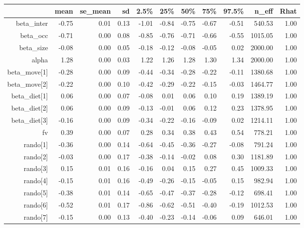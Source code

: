 \begin{table}[ht]
\centering
\begin{tabular}{rrrrrrrrrrr}
  \hline
 & mean & se\_mean & sd & 2.5\% & 25\% & 50\% & 75\% & 97.5\% & n\_eff & Rhat \\ 
  \hline
beta\_inter & -0.75 & 0.01 & 0.13 & -1.01 & -0.84 & -0.75 & -0.67 & -0.51 & 540.53 & 1.00 \\ 
  beta\_occ & -0.71 & 0.00 & 0.08 & -0.85 & -0.76 & -0.71 & -0.66 & -0.55 & 1015.05 & 1.00 \\ 
  beta\_size & -0.08 & 0.00 & 0.05 & -0.18 & -0.12 & -0.08 & -0.05 & 0.02 & 2000.00 & 1.00 \\ 
  alpha & 1.28 & 0.00 & 0.03 & 1.22 & 1.26 & 1.28 & 1.30 & 1.34 & 2000.00 & 1.00 \\ 
  beta\_move[1] & -0.28 & 0.00 & 0.09 & -0.44 & -0.34 & -0.28 & -0.22 & -0.11 & 1380.68 & 1.00 \\ 
  beta\_move[2] & -0.22 & 0.00 & 0.10 & -0.42 & -0.29 & -0.22 & -0.15 & -0.03 & 1464.77 & 1.00 \\ 
  beta\_diet[1] & 0.06 & 0.00 & 0.07 & -0.08 & 0.01 & 0.06 & 0.10 & 0.19 & 1389.19 & 1.00 \\ 
  beta\_diet[2] & 0.06 & 0.00 & 0.09 & -0.13 & -0.01 & 0.06 & 0.12 & 0.23 & 1378.95 & 1.00 \\ 
  beta\_diet[3] & -0.16 & 0.00 & 0.09 & -0.34 & -0.22 & -0.16 & -0.09 & 0.02 & 1214.11 & 1.00 \\ 
  fv & 0.39 & 0.00 & 0.07 & 0.28 & 0.34 & 0.38 & 0.43 & 0.54 & 778.21 & 1.00 \\ 
  rando[1] & -0.36 & 0.00 & 0.14 & -0.64 & -0.45 & -0.36 & -0.27 & -0.08 & 791.24 & 1.00 \\ 
  rando[2] & -0.03 & 0.00 & 0.17 & -0.38 & -0.14 & -0.02 & 0.08 & 0.30 & 1181.89 & 1.00 \\ 
  rando[3] & 0.15 & 0.01 & 0.16 & -0.16 & 0.04 & 0.15 & 0.27 & 0.45 & 1009.33 & 1.00 \\ 
  rando[4] & -0.15 & 0.01 & 0.16 & -0.49 & -0.26 & -0.15 & -0.05 & 0.15 & 982.94 & 1.00 \\ 
  rando[5] & -0.38 & 0.01 & 0.14 & -0.65 & -0.47 & -0.37 & -0.28 & -0.12 & 698.41 & 1.00 \\ 
  rando[6] & -0.52 & 0.01 & 0.17 & -0.86 & -0.62 & -0.51 & -0.40 & -0.19 & 1012.53 & 1.00 \\ 
  rando[7] & -0.15 & 0.00 & 0.13 & -0.40 & -0.23 & -0.14 & -0.06 & 0.09 & 646.01 & 1.00 \\ 

\end{tabular}
\end{table}
